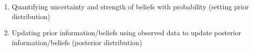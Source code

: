 \begin{enumerate}
	\item Quantifying uncertainty and strength of beliefs with probability (setting prior distribution)
	\item Updating prior information/beliefs using observed data to update posterior information/beliefs (posterior distribution)
\end{enumerate}
